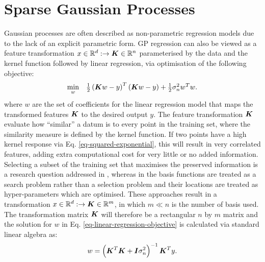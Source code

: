 \documentclass[useAMS,usenatbib,fleqn]{mn2e}
\begin{document}
\section{Sparse Gaussian Processes}
\label{sec-sparse-gaussian-processes}
Gaussian processes are often described as non-parametric regression models due to the lack of an explicit parametric form. GP regression can also be viewed as a feature transformation $x\in \mathbb{R}^{d}:\rightarrow \bmath{K}\in \mathbb{R}^{n}$ parameterised by the data and the kernel function followed by linear regression, via optimisation of the following objective:
\begin{equation}
\label{eq-linear-regression-objective}
\begin{array}{lcl}
\underset{w}{\text{min}} &\frac{1}{2}\left ( \bmath{K}w-y \right )^{T}\left( \bmath{K}w-y \right )+\frac{1}{2}\sigma_{n}^{2}w^{T}w.
\end{array}
\end{equation}
where $w$ are the set of coefficients for the linear regression model that maps the transformed features $\bmath{K}$ to the desired output $y$. The feature transformation $\bmath{K}$ evaluate how ``similar'' a datum is to every point in the training set, where the similarity measure is defined by the kernel function. If two points have a high kernel response via  Eq. \eqref{eq-squared-exponential}, this will result in very correlated features, adding extra computational cost for very little or no added information. Selecting a subset of the training set that maximises the preserved information is a research question addressed in \citep{foster2009}, whereas in \citep{snelson2005} the basis functions are treated as a search problem rather than a selection problem and their locations are treated as hyper-parameters which are optimised. These approaches result in a transformation $x\in \mathbb{R}^{d}:\rightarrow \bmath{K}\in \mathbb{R}^{m}$, in which $m\ll n$ is the number of basis used. The transformation matrix $\bmath{K}$ will therefore be a rectangular $n$ by $m$ matrix and the solution for $w$ in  Eq. \eqref{eq-linear-regression-objective} is calculated via standard linear algebra as:
\begin{equation}
\label{eq-linear-regression-objective-rectangular}
w = \left(\bmath{K}^{T}\bmath{K}+\bmath{I}\sigma_{n}^{2} \right)^{-1}\bmath{K}^{T}y.
\end{equation}
\end{document}

